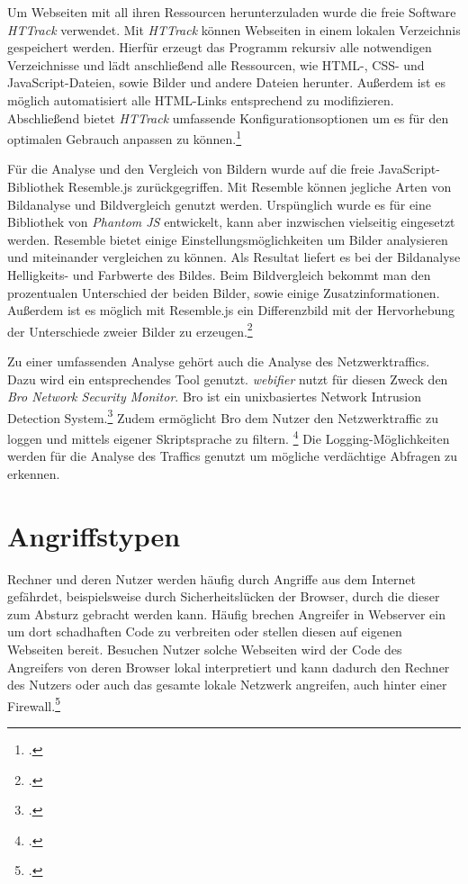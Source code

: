 Um Webseiten mit all ihren Ressourcen herunterzuladen wurde die freie Software \textit{HTTrack}
verwendet. Mit \textit{HTTrack} können Webseiten in einem lokalen Verzeichnis gespeichert werden.
Hierfür erzeugt das Programm rekursiv alle notwendigen Verzeichnisse und lädt anschließend alle
Ressourcen, wie \ac{HTML}-, \ac{CSS}- und JavaScript-Dateien, sowie Bilder und andere Dateien
herunter. Außerdem ist es möglich automatisiert alle \ac{HTML}-Links entsprechend zu modifizieren.
Abschließend bietet \textit{HTTrack} umfassende Konfigurationsoptionen um es für den optimalen
Gebrauch anpassen zu können.\footcite[Vgl.][]{httrack}

Für die Analyse und den Vergleich von Bildern wurde auf die freie JavaScript-Bibliothek Resemble.js
zurückgegriffen. Mit Resemble können jegliche Arten von Bildanalyse und Bildvergleich genutzt
werden. Urspünglich wurde es für eine Bibliothek von \textit{Phantom JS} entwickelt, kann aber
inzwischen vielseitig eingesetzt werden. Resemble bietet einige Einstellungsmöglichkeiten um Bilder
analysieren und miteinander vergleichen zu können. Als Resultat liefert es bei der Bildanalyse
Helligkeits- und Farbwerte des Bildes. Beim Bildvergleich bekommt man den prozentualen Unterschied
der beiden Bilder, sowie einige Zusatzinformationen. Außerdem ist es möglich mit Resemble.js ein
Differenzbild mit der Hervorhebung der Unterschiede zweier Bilder zu erzeugen.\footcite[Vgl.][]{resemblejs}

Zu einer umfassenden Analyse gehört auch die Analyse des Netzwerktraffics. Dazu
wird ein entsprechendes Tool genutzt. \textit{webifier} nutzt für diesen Zweck den \textit{Bro
Network Security Monitor}. Bro ist ein unixbasiertes Network Intrusion Detection System.\footcite[Vgl.][199]{bro} Zudem
ermöglicht Bro dem Nutzer den Netzwerktraffic zu loggen und mittels eigener Skriptsprache zu filtern. \footcite[Vgl.][]{bro2} Die Logging-Möglichkeiten werden für die Analyse des Traffics genutzt um mögliche verdächtige Abfragen zu erkennen.


\section{Angriffstypen}

Rechner und deren Nutzer werden häufig durch Angriffe aus dem Internet gefährdet, beispielsweise
durch Sicherheitslücken der Browser, durch die dieser zum Absturz gebracht werden kann. Häufig
brechen Angreifer in Webserver ein um dort schadhaften Code zu verbreiten oder stellen diesen auf
eigenen Webseiten bereit. Besuchen Nutzer solche Webseiten wird der Code des Angreifers von deren
Browser lokal interpretiert und kann dadurch den Rechner des Nutzers oder auch das gesamte lokale
Netzwerk angreifen, auch hinter einer Firewall.\footcite[Vgl.][1\psqq]{clientSideAttacks}


